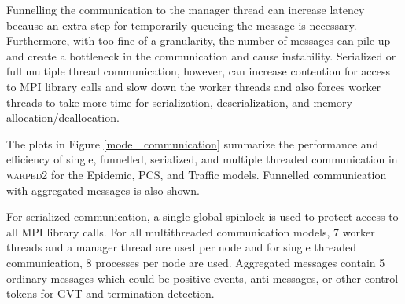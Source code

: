 \documentclass[11pt]{book}
\begin{document}
Funnelling the communication to the manager thread can increase latency because an extra step
for temporarily queueing the message is necessary.  Furthermore, with too fine of a granularity,
the number of messages can pile up and create a bottleneck in the communication and cause
instability.  Serialized or full multiple thread communication, however, can increase contention
for access to MPI library calls and slow down the worker threads and also forces worker
threads to take more time for serialization, deserialization, and memory allocation/deallocation.

The plots in Figure \ref{model_communication} summarize the performance and efficiency of single,
funnelled, serialized, and multiple threaded communication in \textsc{warped2} for the Epidemic,
PCS, and Traffic models.  Funnelled communication with aggregated messages is also shown.

For serialized communication, a single global spinlock is used to protect access to all MPI library
calls.  For all multithreaded communication models, 7 worker threads and a manager thread are used
per node and for single threaded communication, 8 processes per node are used.  Aggregated messages
contain 5 ordinary messages which could be positive events, anti-messages, or other control
tokens for GVT and termination detection.
\end{document}
